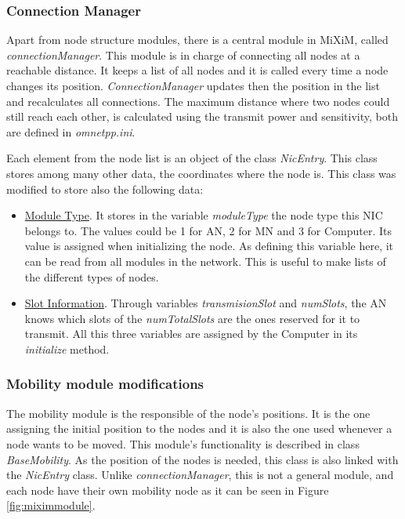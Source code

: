 \subsubsection{Connection Manager}

Apart from node structure modules, there is a central module in \ac{MiXiM}, called \textit{connectionManager}. This module is in charge of connecting
all nodes at a reachable distance. It keeps a list of all nodes and it is called every time a node changes its position. \textit{ConnectionManager} 
updates then the position in the list and recalculates all connections. The maximum distance where two nodes could still reach each other, is 
calculated using the transmit power and sensitivity, both are defined in \textit{omnetpp.ini}.

Each element from the node list is an object of the class \textit{NicEntry}. This class stores among many other data, the coordinates where the node is.
This class was modified to store also the following data:

\begin{itemize}
 \item \underline{Module Type}. It stores in the variable \textit{moduleType} the node type this \ac{NIC} belongs to. The values could be 1 for \ac{AN}, 
2 for \ac{MN} and 3 for Computer. Its value is assigned when initializing the node. As defining this variable here, it can be read from all modules in the 
network. This is useful to make lists of the different types of nodes.
 \item \underline{Slot Information}. Through variables \textit{transmisionSlot} and \textit{numSlots}, the \ac{AN} knows which slots of the 
\textit{numTotalSlots} are the ones reserved for it to transmit. All this three variables are assigned by the Computer in its \textit{initialize} method.
\end{itemize}

\subsubsection{Mobility module modifications}

The mobility module is the responsible of the node's positions. It is the one assigning the initial position to the nodes and it is also the one
used whenever a node wants to be moved. This module's functionality is described in class \textit{BaseMobility}. As the position of the nodes is needed,
this class is also linked with the \textit{NicEntry} class. Unlike \textit{connectionManager}, this is not a general module, and each node have their own
mobility node as it can be seen in Figure \ref{fig:miximmodule}.

